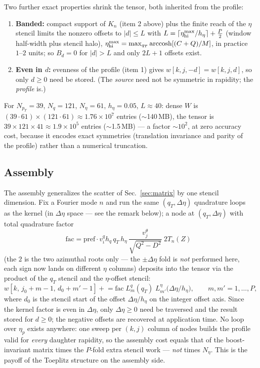 \documentclass[11pt]{article}
\begin{document}
Two further exact properties shrink the tensor, both inherited from the
profile:
\begin{enumerate}
\item \textbf{Banded:} compact support of $K_n$ (item 2 above) plus the
finite reach of the $\eta$ stencil limits the nonzero offsets to
$|d|\le L$ with $L=\lceil\eta_{\rm hi}^{\max}/h_\eta\rceil+\tfrac{P}{2}$
(window half-width plus stencil halo), $\eta_{\rm hi}^{\max}=
\max_{q_T}\operatorname{arccosh}[(C+Q)/M]$, in practice $1$--$2$ units; so
$B_d=0$ for $|d|>L$ and only $2L+1$ offsets exist.
\item \textbf{Even in $d$:} evenness of the profile (item 1) gives
$w[k,j,-d]=w[k,j,d]$, so only $d\ge0$ need be stored.  (The \emph{source}
need not be symmetric in rapidity; the \emph{profile} is.)
\end{enumerate}
For $N_{p_T}=39$, $N_q=121$, $N_\eta=61$, $h_\eta=0.05$,
$L\approx40$: dense $W$ is
$(39\cdot61)\times(121\cdot61)\approx1.76\times10^{7}$ entries
($\sim$140\,MB), the tensor is $39\times121\times41\approx1.9\times10^{5}$
entries ($\sim$1.5\,MB) --- a factor $\sim10^{2}$, at zero accuracy cost,
because it encodes exact symmetries (translation invariance and parity of
the profile) rather than a numerical truncation.

\subsection{Assembly}
\label{sec:toeplitz-assembly}

The assembly generalizes the scatter of Sec.~\ref{sec:matrix} by one
stencil dimension.  Fix a Fourier mode $n$ and run the same
$(q_T,\Delta\eta)$ quadrature loops as the kernel (in $\Delta\eta$ space
--- see the remark below); a node at $(q_T,\Delta\eta)$ with total
quadrature factor
\begin{equation}
\text{fac}
= \text{pref}\cdot v^{q}_i h_q\, q_T\, h_\eta\,
\frac{v^{\theta}_j}{\sqrt{Q^{2}-D^{2}}}\; 2T_n(Z)
\end{equation}
(the $2$ is the two azimuthal roots only --- the $\pm\Delta\eta$ fold is
\emph{not} performed here, each sign now lands on different $\eta$
columns) deposits into the tensor via the product of the $q_T$ stencil
and the $\eta$-offset stencil:
\begin{equation}
w[k,\,j_0+m-1,\,d_0+m'-1] \mathrel{+}= \text{fac}\;
L^{q}_{m}(q_T)\; L^{\eta}_{m'}\!\big(\Delta\eta/h_\eta\big),
\qquad m,m'=1,\dots,P,
\end{equation}
where $d_0$ is the stencil start of the offset $\Delta\eta/h_\eta$ on the
integer offset axis.  Since the kernel factor is even in $\Delta\eta$,
only $\Delta\eta\ge0$ need be traversed and the result stored for
$d\ge0$; the negative offsets are recovered at application time.  No loop
over $\eta_p$ exists anywhere: one sweep per $(k,j)$ column of nodes
builds the profile valid for \emph{every} daughter rapidity, so the
assembly cost equals that of the boost-invariant matrix times the
$P$-fold extra stencil work --- \emph{not} times $N_\eta$.  This is the
payoff of the Toeplitz structure on the assembly side.
\end{document}
